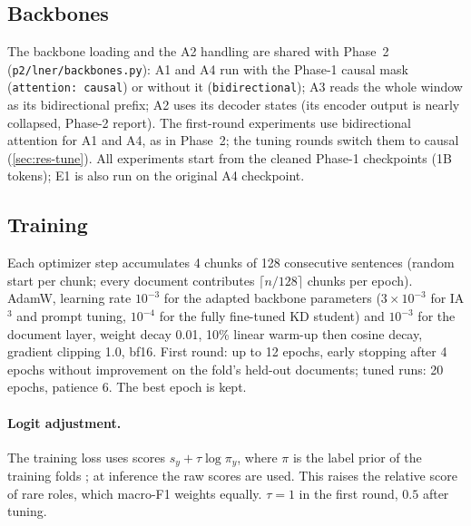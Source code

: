 \documentclass[11pt,a4paper]{article}
\newcommand{\code}[1]{\texttt{\small #1}}
\begin{document}
\subsection{Backbones}
The backbone loading and the A2 handling are shared with Phase~2 (\code{p2/lner/backbones.py}): A1 and A4 run
with the Phase-1 causal mask (\code{attention: causal}) or without it (\code{bidirectional}); A3 reads the
whole window as its bidirectional prefix; A2 uses its decoder states (its encoder output is nearly collapsed,
Phase-2 report).  The first-round experiments use bidirectional attention for A1 and A4, as in Phase~2; the
tuning rounds switch them to causal (\autoref{sec:res-tune}).  All experiments start from the cleaned Phase-1
checkpoints (1B tokens); E1 is also run on the original A4 checkpoint.

\subsection{Training}
Each optimizer step accumulates 4 chunks of 128 consecutive sentences (random start per chunk; every
document contributes $\lceil n/128\rceil$ chunks per epoch).  AdamW, learning rate $10^{-3}$ for the adapted
backbone parameters ($3\times10^{-3}$ for IA$^3$ and prompt tuning, $10^{-4}$ for the fully fine-tuned KD
student) and $10^{-3}$ for the document layer, weight decay 0.01, 10\% linear warm-up then cosine decay,
gradient clipping 1.0, bf16.  First round: up to 12 epochs, early stopping after 4 epochs without improvement
on the fold's held-out documents; tuned runs: 20 epochs, patience 6.  The best epoch is kept.

\paragraph{Logit adjustment.} The training loss uses scores $s_y + \tau\log\pi_y$, where $\pi$ is the label
prior of the training folds \cite{menon2021logit}; at inference the raw scores are used.  This raises the
relative score of rare roles, which macro-F1 weights equally.  $\tau=1$ in the first round, $0.5$ after tuning.
\end{document}
